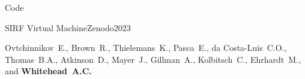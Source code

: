 \documentclass{cv}
\begin{document}
\begin{spacing}{1.0}
\begin{rSection}{Code}
            \item \begin{rSubsection}{SIRF Virtual Machine}{}{Zenodo}{2023}
                \item Ovtchinnikov~E., Brown~R., Thielemans~K., Pasca~E., da Costa-Luis~C.O., Thomas~B.A., Atkinson~D., Mayer~J., Gillman~A., Kolbitsch~C., Ehrhardt~M., and \textbf{Whitehead~A.C.}
            \end{rSubsection}
        \end{rSection}
    \end{spacing}
\end{document}
